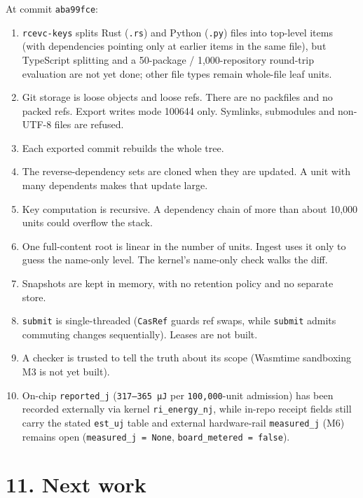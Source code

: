 \documentclass[10pt,letterpaper]{article}
\providecommand{\tightlist}{\setlength{\itemsep}{1pt}\setlength{\parskip}{0pt}}
\begin{document}
At commit \texttt{aba99fce}:

\begin{enumerate}
\def\labelenumi{\arabic{enumi}.}
\tightlist
\item
  \texttt{rcevc-keys} splits Rust (\texttt{.rs}) and Python
  (\texttt{.py}) files into top-level items (with dependencies pointing
  only at earlier items in the same file), but TypeScript splitting and
  a 50-package / 1,000-repository round-trip evaluation are not yet
  done; other file types remain whole-file leaf units.
\item
  Git storage is loose objects and loose refs. There are no packfiles
  and no packed refs. Export writes mode 100644 only. Symlinks,
  submodules and non-UTF-8 files are refused.
\item
  Each exported commit rebuilds the whole tree.
\item
  The reverse-dependency sets are cloned when they are updated. A unit
  with many dependents makes that update large.
\item
  Key computation is recursive. A dependency chain of more than about
  10,000 units could overflow the stack.
\item
  One full-content root is linear in the number of units. Ingest uses it
  only to guess the name-only level. The kernel's name-only check walks
  the diff.
\item
  Snapshots are kept in memory, with no retention policy and no separate
  store.
\item
  \texttt{submit} is single-threaded (\texttt{CasRef} guards ref swaps,
  while \texttt{submit} admits commuting changes sequentially). Leases
  are not built.
\item
  A checker is trusted to tell the truth about its scope (Wasmtime
  sandboxing M3 is not yet built).
\item
  On-chip \texttt{reported\_j} (\texttt{317–365\ µJ} per
  \texttt{100,000}-unit admission) has been recorded externally via
  kernel \texttt{ri\_energy\_nj}, while in-repo receipt fields still
  carry the stated \texttt{est\_uj} table and external hardware-rail
  \texttt{measured\_j} (M6) remains open (\texttt{measured\_\allowbreak{}j\ =\ None},
  \texttt{board\_\allowbreak{}metered\ =\ false}).
\end{enumerate}

\section{11. Next work}\label{next-work}
\end{document}
